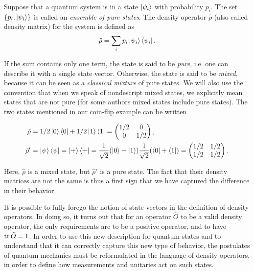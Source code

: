 \begin{definition}
    Suppose that a quantum system is in a state $\ket{\psi_i}$ with probability $p_i$. The set $\{p_i, \ket{\psi_i}\}$ is called an \textit{ensemble of pure states}. The density operator $\hat{\rho}$ (also called density matrix) for the system is defined as
    \begin{equation}
        \hat{\rho} = \sum_i p_i \ket{\psi_i}\bra{\psi_i}.
    \end{equation}
\end{definition}

If the sum contains only one term, the state is said to be \textit{pure}, i.e. one can describe it with a single state vector. Otherwise, the state is said to be \textit{mixed}, because it can be seen as a \textit{classical mixture} of pure states. We will also use the convention that when we speak of nondescript mixed states, we explicitly mean states that are not pure (for some authors mixed states include pure states). The two states mentioned in our coin-flip example can be written

\begin{align}
    \hat{\rho} &= 1/2 \ket{0}\bra{0} + 1/2 \ket{1}\bra{1} = \left(\begin{matrix}
        1/2 & 0\\
        0 & 1/2
    \end{matrix}\right),\\
    \hat{\rho}' &= \ket{\psi}\bra{\psi} = \ket{+}\bra{+} = \frac{1}{\sqrt{2}}(\ket{0} + \ket{1})\frac{1}{\sqrt{2}}(\bra{0} + \bra{1}) = \left(\begin{matrix}
        1/2 & 1/2\\
        1/2 & 1/2
    \end{matrix}\right).
\end{align}

Here, $\hat{\rho}$ is a mixed state, but $\hat{\rho}'$ is a pure state. The fact that their density matrices are not the same is thus a first sign that we have captured the difference in their behavior.

It is possible to fully forego the notion of state vectors in the definition of density operators. In doing so, it turns out that for an operator $\hat{O}$ to be a valid density operator, the only requirements are to be a positive operator, and to have $\operatorname{tr} \hat{O} = 1$. In order to use this new description for quantum states and to understand that it can correctly capture this new type of behavior, the postulates of quantum mechanics must be reformulated in the language of density operators, in order to define how measurements and unitaries act on such states.

